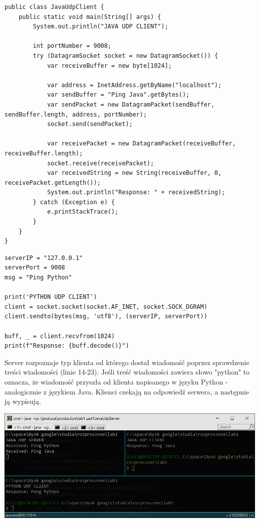\documentclass[12pt]{article}
\begin{document}
\begin{verbatim}
public class JavaUdpClient {
    public static void main(String[] args) {
        System.out.println("JAVA UDP CLIENT");

        int portNumber = 9008;
        try (DatagramSocket socket = new DatagramSocket()) {
            var receiveBuffer = new byte[1024];

            var address = InetAddress.getByName("localhost");
            var sendBuffer = "Ping Java".getBytes();
            var sendPacket = new DatagramPacket(sendBuffer, sendBuffer.length, address, portNumber);
            socket.send(sendPacket);

            var receivePacket = new DatagramPacket(receiveBuffer, receiveBuffer.length);
            socket.receive(receivePacket);
            var receivedString = new String(receiveBuffer, 0, receivePacket.getLength());
            System.out.println("Response: " + receivedString);
        } catch (Exception e) {
            e.printStackTrace();
        }
    }
}
\end{verbatim}

\newpage
\begin{verbatim}
serverIP = "127.0.0.1"
serverPort = 9008
msg = "Ping Python"

print('PYTHON UDP CLIENT')
client = socket.socket(socket.AF_INET, socket.SOCK_DGRAM)
client.sendto(bytes(msg, 'utf8'), (serverIP, serverPort))

buff, _ = client.recvfrom(1024)
print(f"Response: {buff.decode()}")
\end{verbatim}

Server rozpoznaje typ klienta od którego dostał wiadomość poprzez sprawdzenie treści wiadomości (linie 14-23). Jeśli treść wiadomości zawiera słowo "python" to oznacza, że wiadomość przyszła od klienta napisanego w języku Python - analogicznie z językiem Java. Klienci czekają na odpowiedź serwera, a następnie ją wypisują.


\begin{center}
\centering
    \includegraphics[scale=0.8]{4.png}
\end{center}
\end{document}
